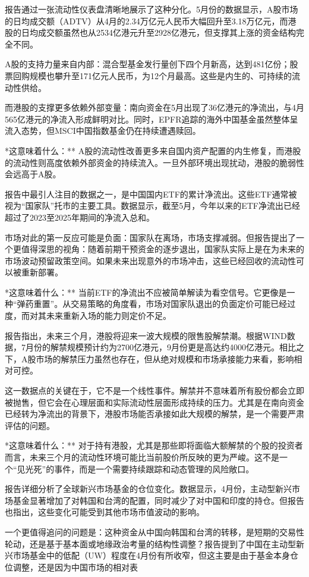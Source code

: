 \documentclass[11pt]{ctexart}
\begin{document}
报告通过一张流动性仪表盘清晰地展示了这种分化。5月份的数据显示，A股市场的日均成交额（ADTV）从4月的2.34万亿元人民币大幅回升至3.18万亿元，而港股的日均成交额虽然也从2534亿港元升至2928亿港元，但支撑其上涨的资金结构完全不同。

A股的支持力量来自内部：混合型基金发行量创下四个月新高，达到481亿份；股票回购规模也攀升至171亿元人民币，为12个月最高。这些是内生的、可持续的流动性供给。

而港股的支撑更多依赖外部变量：南向资金在5月出现了36亿港元的净流出，与4月565亿港元的净流入形成鲜明对比。同时，EPFR追踪的海外中国基金虽然整体呈流入态势，但MSCI中国指数基金仍在持续遭遇赎回。

*这意味着什么：** A股的流动性改善更多来自国内资产配置的内生修复，而港股的流动性则高度依赖外部资金的持续流入。一旦外部环境出现扰动，港股的脆弱性会远高于A股。

报告中最引人注目的数据之一，是中国国内ETF的累计净流出。这些ETF通常被视为“国家队”托市的主要工具。数据显示，截至5月，今年以来的ETF净流出已经超过了2023至2025年期间的净流入总和。

市场对此的第一反应可能是负面：国家队在离场，市场支撑减弱。但报告提出了一个更值得深思的视角：随着前期干预资金的逐步退出，国家队实际上是在为未来的市场波动预留政策空间。如果未来出现意外的市场冲击，这些已经回收的流动性可以被重新部署。

*这意味着什么：** 当前ETF的净流出不应被简单解读为看空信号。它更像是一种“弹药重置”。从交易策略的角度看，市场对国家队退出的负面定价可能已经过度，而对其未来重新入场的能力则定价不足。

报告指出，未来三个月，港股将迎来一波大规模的限售股解禁潮。根据WIND数据，7月份的解禁规模预计约为2700亿港元，9月份更是高达约4000亿港元。相比之下，A股市场的解禁压力虽然也存在，但从绝对规模和市场承接能力来看，影响相对可控。

这一数据点的关键在于，它不是一个线性事件。解禁并不意味着所有股份都会立即被抛售，但它会在心理层面和实际流动性层面形成持续的压力。尤其是在南向资金已经转为净流出的背景下，港股市场能否承接如此大规模的解禁，是一个需要严肃评估的问题。

*这意味着什么：** 对于持有港股，尤其是那些即将面临大额解禁的个股的投资者而言，未来三个月的流动性环境可能比当前股价所反映的更为严峻。这不是一个“见光死”的事件，而是一个需要持续跟踪和动态管理的风险敞口。

报告详细分析了全球新兴市场基金的仓位变化。数据显示，4月份，主动型新兴市场基金显著增加了对韩国和台湾的配置，同时减少了对中国和印度的持仓。但报告也指出，这些变化可能受到其他市场市值波动的影响。

一个更值得追问的问题是：这种资金从中国向韩国和台湾的转移，是短期的交易性轮动，还是基于基本面或地缘政治考量的结构性调整？报告提到了中国在主动型新兴市场基金中的低配（UW）程度在4月份有所收窄，但这主要是由于基金本身仓位调整，还是因为中国市场的相对表
\end{document}
